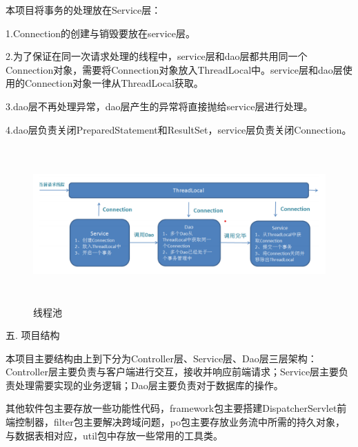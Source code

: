 本项目将事务的处理放在Service层：

1.Connection的创建与销毁要放在service层。

2.为了保证在同一次请求处理的线程中，service层和dao层都共用同一个Connection对象，需要将Connection对象放入ThreadLocal中。service层和dao层使用的Connection对象一律从ThreadLocal获取。

3.dao层不再处理异常，dao层产生的异常将直接抛给service层进行处理。

4.dao层负责关闭PreparedStatement和ResultSet，service层负责关闭Connection。

\begin{figure}[H]
    \centering
    \includegraphics[width=15cm,height=6cm]{figures/thread.png}
    \caption{线程池}
\end{figure}

\noindent
五. 项目结构

本项目主要结构由上到下分为Controller层、Service层、Dao层三层架构：Controller层主要负责与客户端进行交互，接收并响应前端请求；Service层主要负责处理需要实现的业务逻辑；Dao层主要负责对于数据库的操作。

其他软件包主要存放一些功能性代码，framework包主要搭建DispatcherServlet前端控制器，filter包主要解决跨域问题，po包主要存放业务流中所需的持久对象，与数据表相对应，util包中存放一些常用的工具类。

